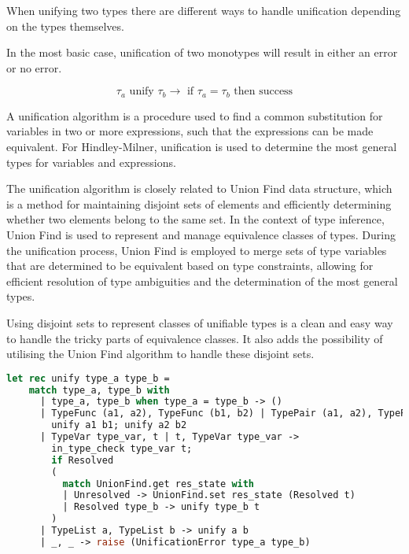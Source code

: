 \documentclass{l4proj}
\begin{document}
When unifying two types there are different ways to handle unification depending on the types themselves.

In the most basic case, unification of two monotypes will result in either an error or no error.

\[\tau_a \text{ unify } \tau_b \rightarrow \text{ if } \tau_a = \tau_b \text{ then success}\]

A unification algorithm is a procedure used to find a common substitution for variables in two or more expressions, such that the expressions can be made equivalent.
For Hindley-Milner, unification is used to determine the most general types for variables and expressions.


The unification algorithm is closely related to Union Find data structure, which is a method for maintaining disjoint sets of elements and efficiently determining whether two elements belong to the same set.
In the context of type inference, Union Find is used to represent and manage equivalence classes of types.
During the unification process, Union Find is employed to merge sets of type variables that are determined to be equivalent based on type constraints, allowing for efficient resolution of type ambiguities and the determination of the most general types.

Using disjoint sets to represent classes of unifiable types is a clean and easy way to handle the tricky parts of equivalence classes.
It also adds the possibility of utilising the Union Find algorithm to handle these disjoint sets.

\begin{lstlisting}[language=Caml]
    let rec unify type_a type_b = 
    match type_a, type_b with
      | type_a, type_b when type_a = type_b -> () 
      | TypeFunc (a1, a2), TypeFunc (b1, b2) | TypePair (a1, a2), TypePair (b1, b2) -> 
        unify a1 b1; unify a2 b2
      | TypeVar type_var, t | t, TypeVar type_var -> 
        in_type_check type_var t; 
        if Resolved
        (
          match UnionFind.get res_state with
          | Unresolved -> UnionFind.set res_state (Resolved t)
          | Resolved type_b -> unify type_b t
        )
      | TypeList a, TypeList b -> unify a b
      | _, _ -> raise (UnificationError type_a type_b)
\end{lstlisting}

\end{document}
